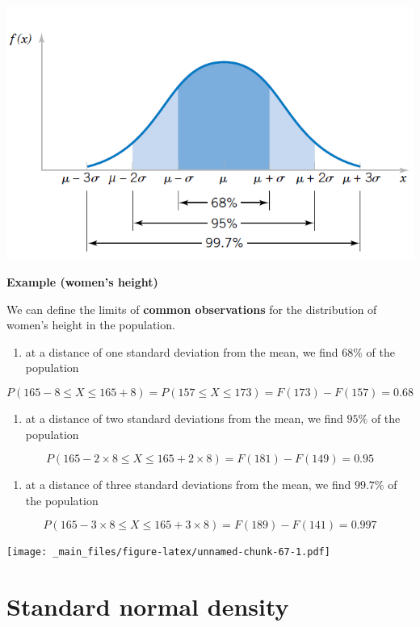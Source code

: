 \documentclass[
]{book}
\providecommand{\tightlist}{%
  \setlength{\itemsep}{0pt}\setlength{\parskip}{0pt}}
\begin{document}
\includegraphics{./figures/probs.png}

\textbf{Example (women's height)}

We can define the limits of \textbf{common observations} for the distribution of women's height in the population.

\begin{enumerate}
\def\labelenumi{\arabic{enumi})}
\tightlist
\item
  at a distance of one standard deviation from the mean, we find \(68\%\) of the population
\end{enumerate}

\[P(165-8 \leq X \leq 165+8)=P(157 \leq X \leq 173)=F(173)-F(157)=0.68\]

\begin{enumerate}
\def\labelenumi{\arabic{enumi})}
\setcounter{enumi}{1}
\tightlist
\item
  at a distance of two standard deviations from the mean, we find \(95\%\) of the population
\end{enumerate}

\[P(165-2 \times 8 \leq X \leq 165+2\times 8)=F(181)-F(149)=0.95\]

\begin{enumerate}
\def\labelenumi{\arabic{enumi})}
\setcounter{enumi}{2}
\tightlist
\item
  at a distance of three standard deviations from the mean, we find \(99.7\%\) of the population
\end{enumerate}

\[P(165-3 \times 8 \leq X \leq 165+3\times 8)=F(189)-F(141)=0.997\]

\texttt{[image: \_main\_files/figure-latex/unnamed-chunk-67-1.pdf]}

\hypertarget{standard-normal-density}{%
\section{Standard normal density}\label{standard-normal-density}}
\end{document}
